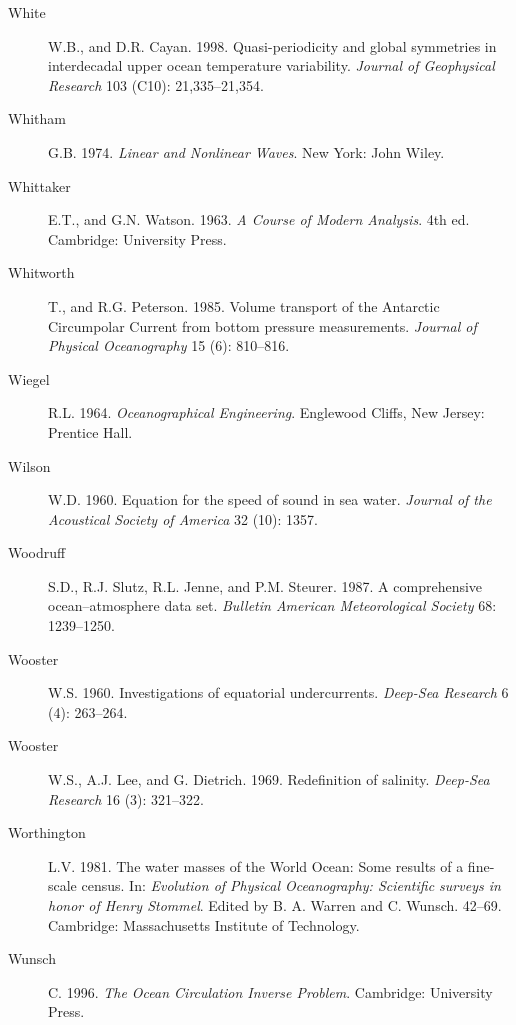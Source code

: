 \begin{description}
\item [White]W.B., and D.R. Cayan. 1998. Quasi-periodicity and global
  symmetries in interdecadal upper ocean temperature
  variability. \textit{Journal of Geophysical Research} 103 (C10):
  21,335--21,354.

\item [Whitham]G.B. 1974. \textit{Linear and Nonlinear Waves}.  New
  York: John Wiley.

\item [Whittaker]E.T., and G.N. Watson. 1963. \textit{A Course of
  Modern Analysis}. 4th ed.  Cambridge: University Press.

\item [Whitworth]T., and R.G. Peterson. 1985. Volume transport of the
  Antarctic Circumpolar Current from bottom pressure
  measurements. \textit{Journal of Physical Oceanography} 15 (6):
  810--816.

\item [Wiegel]R.L. 1964. \textit{Oceanographical Engineering}.
  Englewood Cliffs, New Jersey: Prentice Hall.

\item [Wilson]W.D. 1960. Equation for the speed of sound in sea
  water. \textit{Journal of the Acoustical Society of America} 32
  (10): 1357.

\item [Woodruff]S.D., R.J. Slutz, R.L. Jenne, and
  P.M. Steurer. 1987. A comprehensive ocean--atmosphere data
  set. \textit{Bulletin American Meteorological Society} 68:
  1239--1250.

\item [Wooster]W.S. 1960. Investigations of equatorial
  undercurrents. \textit{Deep-Sea Research} 6 (4): 263--264.

\item [Wooster]W.S., A.J. Lee, and G. Dietrich. 1969. Redefinition of
  salinity.  \textit{Deep-Sea Research} 16 (3): 321--322.

\item [Worthington]L.V. 1981. The water masses of the World Ocean:
  Some results of a fine-scale census. In: \textit{Evolution of
    Physical Oceanography: Scientific surveys in honor of Henry
    Stommel}. Edited by B. A. Warren and C. Wunsch. 42--69. Cambridge:
  Massachusetts Institute of Technology.

\item [Wunsch]C. 1996. \textit{The Ocean Circulation Inverse Problem}.
  Cambridge: University Press.


\end{description}
